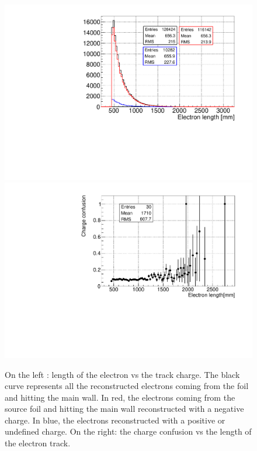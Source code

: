 \documentclass[main.tex]{subfiles}
\begin{document}
\begin{figure}[h!]
\begin{center}
\includegraphics[scale=0.34]{pictures/Chap5/length_source_charge_confusion_2.pdf}
\includegraphics[scale=0.34]{pictures/Chap5/charge_confusion_length_source.pdf}
\caption{On the left : length of the electron vs the track charge. The black curve represents all the reconstructed electrons coming from the foil and hitting the main wall. In red, the electrons coming from the source foil and hitting the main wall reconstructed with a negative charge. In blue, the electrons reconstructed with a positive or undefined charge. On the right: the charge confusion vs the length of the electron track.}
\label{charge_confusion_source_plots}
\end{center}
\end{figure}
\end{document}
